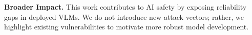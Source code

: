 \documentclass[10pt,twocolumn,letterpaper]{article}
\begin{document}
\vspace{1em}
\noindent\textbf{Broader Impact.} This work contributes to AI safety by exposing reliability gaps in deployed VLMs. We do not introduce new attack vectors; rather, we highlight existing vulnerabilities to motivate more robust model development.

{\small


}
\end{document}
